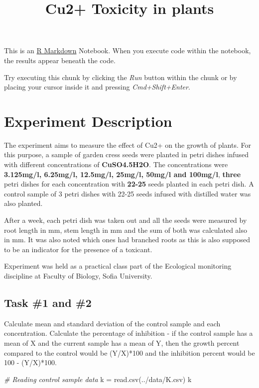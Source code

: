 \documentclass[
]{article}
\title{Cu2+ Toxicity in plants}
\author{}
\date{\vspace{-2.5em}}
\newenvironment{Shaded}{\begin{snugshade}}{\end{snugshade}}
\newcommand{\CommentTok}[1]{\textcolor[rgb]{0.56,0.35,0.01}{\textit{#1}}}
\newcommand{\FunctionTok}[1]{\textcolor[rgb]{0.00,0.00,0.00}{#1}}
\newcommand{\NormalTok}[1]{#1}
\newcommand{\OtherTok}[1]{\textcolor[rgb]{0.56,0.35,0.01}{#1}}
\newcommand{\StringTok}[1]{\textcolor[rgb]{0.31,0.60,0.02}{#1}}
\begin{document}
\maketitle

This is an \href{http://rmarkdown.rstudio.com}{R Markdown} Notebook.
When you execute code within the notebook, the results appear beneath
the code.

Try executing this chunk by clicking the \emph{Run} button within the
chunk or by placing your cursor inside it and pressing
\emph{Cmd+Shift+Enter}.

\hypertarget{experiment-description}{%
\section{Experiment Description}\label{experiment-description}}

The experiment aims to measure the effect of Cu2+ on the growth of
plants. For this purpose, a sample of garden cress seeds were planted in
petri dishes infused with different concentrations of
\textbf{CuSO4.5H2O}. The concentrations were \textbf{3.125mg/l,
6.25mg/l, 12.5mg/l, 25mg/l, 50mg/l and 100mg/l}, \textbf{three} petri
dishes for each concentration with \textbf{22-25} seeds planted in each
petri dish. A control sample of 3 petri dishes with 22-25 seeds infused
with distilled water was also planted.

After a week, each petri dish was taken out and all the seeds were
measured by root length in mm, stem length in mm and the sum of both was
calculated also in mm. It was also noted which ones had branched roots
as this is also supposed to be an indicator for the presence of a
toxicant.

Experiment was held as a practical class part of the Ecological
monitoring discipline at Faculty of Biology, Sofia University.

\hypertarget{task-1-and-2}{%
\subsection{Task \#1 and \#2}\label{task-1-and-2}}

Calculate mean and standard deviation of the control sample and each
concentration. Calculate the percentage of inhibition - if the control
sample has a mean of X and the current sample has a mean of Y, then the
growth percent compared to the control would be (Y/X)*100 and the
inhibition percent would be 100 - (Y/X)*100.

\begin{Shaded}
\begin{Highlighting}[]
\CommentTok{\# Reading control sample data}
\NormalTok{k }\OtherTok{=} \FunctionTok{read.csv}\NormalTok{(}\StringTok{\textquotesingle{}../data/K.csv\textquotesingle{}}\NormalTok{)}
\NormalTok{k}
\end{Highlighting}
\end{Shaded}
\end{document}
